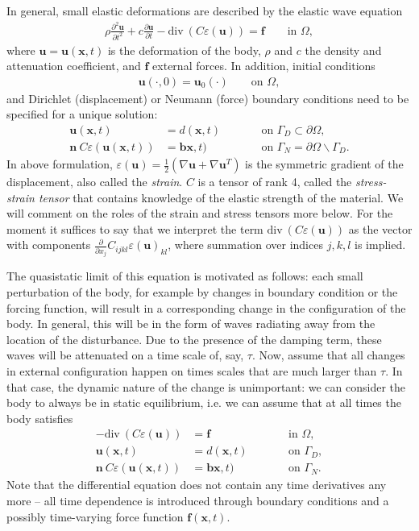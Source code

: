 \documentclass{article}
\renewcommand{\vec}[1]{\mathbf{#1}}
\renewcommand{\div}{\mathrm{div}\ }
\begin{document}
In general, small elastic deformations are described by the elastic wave
equation
\begin{gather*}
  \rho \frac{\partial^2 \vec u}{\partial t^2} 
  + c \frac{\partial \vec u}{\partial t}
  - \div ( C \varepsilon(\vec u)) = \vec f
  \qquad
  \text{in $\Omega$},
\end{gather*}
where $\vec u=\vec u (\vec x,t)$ is the deformation of the body, $\rho$ and
$c$ the density and attenuation coefficient, and $\vec f$ external forces. In
addition, initial conditions
\begin{align*}
  \vec u(\cdot, 0) = \vec u_0(\cdot)
  \qquad
  \text{on $\Omega$},
\end{align*}
and Dirichlet (displacement) or Neumann (force) boundary conditions need
to be specified for a unique solution:
\begin{align*}
  \vec u(\vec x,t) &= d(\vec x,t)
  \qquad
  &&\text{on $\Gamma_D\subset\partial\Omega$},  
  \\
  \vec n \ C \varepsilon(\vec u(\vec x,t)) &= \vec b\vec x,t)
  \qquad
  &&\text{on $\Gamma_N=\partial\Omega\backslash\Gamma_D$}.
\end{align*}
In above formulation, $\varepsilon(\vec u)= \tfrac 12 (\nabla \vec u + \nabla
\vec u^T)$ is the symmetric gradient of the displacement, also called the
\textit{strain}. $C$ is a tensor of rank 4, called the \textit{stress-strain
  tensor} that contains knowledge of the elastic strength of the material. We
will comment on the roles of the strain and stress tensors more below. For the
moment it suffices to say that we interpret the term $\div ( C
\varepsilon(\vec u))$ as the vector with components $\tfrac \partial{\partial
  x_j} C_{ijkl} \varepsilon(\vec u)_{kl}$, where summation over indices
$j,k,l$ is implied.

The quasistatic limit of this equation is motivated as follows: each small
perturbation of the body, for example by changes in boundary condition or the
forcing function, will result in a corresponding change in the configuration
of the body. In general, this will be in the form of waves radiating away from
the location of the disturbance. Due to the presence of the damping term,
these waves will be attenuated on a time scale of, say, $\tau$. Now, assume
that all changes in external configuration happen on times scales that are
much larger than $\tau$. In that case, the dynamic nature of the change is
unimportant: we can consider the body to always be in static equilibrium,
i.e. we can assume that at all times the body satisfies
\begin{align*}
  - \div ( C \varepsilon(\vec u)) &= \vec f
  &&\text{in $\Omega$},
  \\
  \vec u(\vec x,t) &= d(\vec x,t)
  \qquad
  &&\text{on $\Gamma_D$},
  \\
  \vec n \ C \varepsilon(\vec u(\vec x,t)) &= \vec b\vec x,t)
  \qquad
  &&\text{on $\Gamma_N$}.
\end{align*}
Note that the differential equation does not contain any time derivatives any
more -- all time dependence is introduced through boundary conditions and a
possibly time-varying force function $\vec f(\vec x,t)$.
\end{document}
